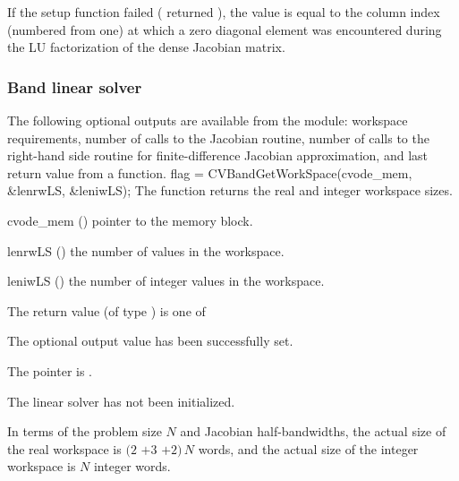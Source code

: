 {
  If the {\cvdense} setup function failed ( returned ),
  the value  is equal to the column index (numbered from one) at which
  a zero diagonal element was encountered during the LU factorization of the 
  dense Jacobian matrix.
}

\subsubsection{Band linear solver}\label{sss:optout_band}
The following optional outputs are available from the {\cvband} module:
workspace requirements, number of calls to the Jacobian routine, number of 
calls to the right-hand side routine for finite-difference Jacobian approximation,
and last return value from a {\cvband} function.
{
  flag = CVBandGetWorkSpace(cvode\_mem, \&lenrwLS, \&leniwLS);
}
{
  The function  returns the
  {\cvband} real and integer workspace sizes.
}
{
  \begin{args}
  \item[cvode\_mem] ()
    pointer to the {\cvode} memory block.
  \item[lenrwLS] ()
    the number of  values in the {\cvband} workspace.
  \item[leniwLS] ()
    the number of integer values in the {\cvband} workspace.
  \end{args}
}
{
  The return value  (of type ) is one of
  \begin{args}
  \item[\Id{CVBAND\_SUCCESS}] 
    The optional output value has been successfully set.
  \item[\Id{CVBAND\_MEM\_NULL}]
    The  pointer is .
  \item[\Id{CVBAND\_LMEM\_NULL}]
    The {\cvband} linear solver has not been initialized.
  \end{args}
}
{
  In terms of the problem size $N$ and Jacobian half-bandwidths, 
  the actual size of the real workspace is
  $(2$ $+ 3$  $+ 2)\, N$  words,
  and the actual size of the integer workspace is $N$ integer words.
}
